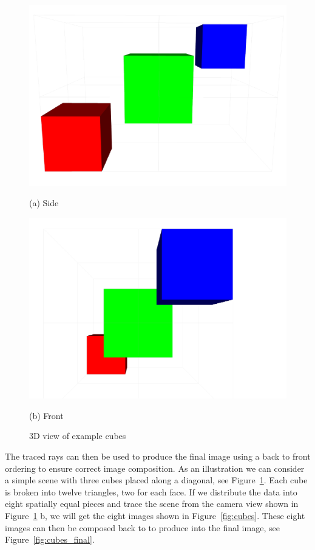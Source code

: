 \begin{figure}[!htb]
  \includegraphics[width=\linewidth]{drawings/side.pdf}
  
(a) Side

\endminipage\hfill
{}
  \includegraphics[width=\linewidth]{drawings/front.pdf}
  
(b) Front

\endminipage\hfill
\caption{3D view of example cubes}
\label{fig:cubes_3d}
\end{figure}

The traced rays can then be used to produce the final image using a back to 
front ordering to ensure correct image composition.  As an illustration we can 
consider a simple scene with three cubes placed along a diagonal, 
see Figure~\ref{fig:cubes_3d}.  Each cube is broken into twelve triangles, two 
for each face.  If we distribute the data into eight spatially equal pieces and 
trace the scene from the camera view shown in Figure~\ref{fig:cubes_3d} b, we 
will get the eight images shown in Figure~\ref{fig:cubes}.  These eight images 
can then be composed back to to produce into the final image, see
Figure~\ref{fig:cubes_final}.


